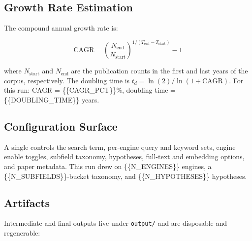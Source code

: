 \documentclass[
]{article}
\begin{document}
\subsection{Growth Rate Estimation}\label{growth-rate-estimation}

The compound annual growth rate is:

\[
\text{CAGR} = \left(\frac{N_{\text{end}}}{N_{\text{start}}}\right)^{1/(T_{\text{end}} - T_{\text{start}})} - 1
\]

where \(N_{\text{start}}\) and \(N_{\text{end}}\) are the publication
counts in the first and last years of the corpus, respectively. The
doubling time is \(t_d = \ln(2) / \ln(1 + \text{CAGR})\). For this run:
CAGR = \{\{CAGR\_PCT\}\}\%, doubling time = \{\{DOUBLING\_TIME\}\}
years.

\subsection{Configuration Surface}\label{configuration-surface-1}

A single  controls the search term,
per-engine query and keyword sets, engine enable toggles, subfield
taxonomy, hypotheses, full-text and embedding options, and paper
metadata. This run drew on \{\{N\_ENGINES\}\} engines, a
\{\{N\_SUBFIELDS\}\}-bucket taxonomy, and \{\{N\_HYPOTHESES\}\}
hypotheses.

\subsection{Artifacts}\label{artifacts}

Intermediate and final outputs live under \texttt{output/} and are
disposable and regenerable:
\end{document}
